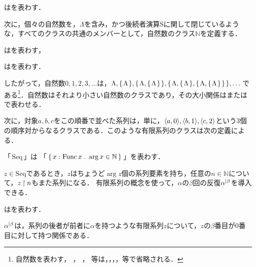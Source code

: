 \begin{df}
\label{df:関数抽象}
はを表わす．
\end{df}

次に，個々の自然数を，$ \Lambda $を含み，かつ後続者演算$\mathrm{S}$に関して閉じているような，すべてのクラスの共通のメンバーとして，自然数のクラス$\mathbb{N}$を定義する．

\begin{df}
\label{df:後続者関数}
はを表わす，
\end{df}

\begin{df}
\label{df:自然数}
はを表わす．
\end{df}
\noindent したがって，自然数$ 0,1,2,3,\dots $は，$ \Lambda,\{\mspace{2mu}\Lambda\mspace{2mu}\},\{\mspace{2mu}\Lambda,\{\mspace{2mu}\Lambda\mspace{2mu}\}\mspace{2mu}\},\{\mspace{2mu}\Lambda,\{\mspace{2mu}\Lambda\mspace{2mu}\},\{\mspace{2mu}\Lambda,\{\mspace{2mu}\Lambda\mspace{2mu}\}\mspace{2mu}\}\mspace{2mu}\},\dots $である\footnote{
    自然数を表わす\kagi{$\Lambda$}，
    ，
    ，
    等は，，，，等で省略される．
}．自然数はそれより小さい自然数のクラスであり，その大小関係は\kagi{$\in$}または\kagi{$ \subset $}で表わせる．

次に，対象$ a,b,c $をこの順番で並べた系列は，単に，$ \langle a,0 \rangle,\langle b,1 \rangle,\langle c,2 \rangle $という$ 3 $個の順序対からなるクラスである．このような有限系列のクラスは次の定義による．
\begin{df}
    「\,$ \mathrm{Seq} $\,」は
    「\,$ \{\,x:
        \func x \con{1} \arg x\in \mathbb{N}
    \,\} $\,」を表わす．
    \label{df:有限系列}
\end{df}
\noindent$ z\in\mathrm{Seq} $であるとき，$ z $はちょうど$ \arg z $個の系列要素を持ち，任意の$ n\in \mathbb{N} $について，$z\mathbin{\upharpoonright} n$もまた系列になる．
有限系列の概念を使って，$\alpha$の$\beta$回の反復$\iter{\alpha}{\beta}$を導入できる．

\begin{df}
\label{df:関係の反復}
\kagi{$
    \iter{\alpha}{\beta}
$}はを表わす．
\end{df}
\noindent$\iter{\alpha}{\beta}$は，系列の後者が前者に$\alpha$を持つような有限系列$z$について，$z$の$\beta$番目が$0$番目に対して持つ関係である．

